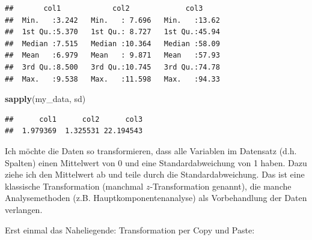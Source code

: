 \documentclass[]{book}
\newenvironment{Shaded}{\begin{snugshade}}{\end{snugshade}}
\newcommand{\DataTypeTok}[1]{\textcolor[rgb]{0.13,0.29,0.53}{#1}}
\newcommand{\KeywordTok}[1]{\textcolor[rgb]{0.13,0.29,0.53}{\textbf{#1}}}
\newcommand{\NormalTok}[1]{#1}
\newcommand{\OperatorTok}[1]{\textcolor[rgb]{0.81,0.36,0.00}{\textbf{#1}}}
\newcommand{\StringTok}[1]{\textcolor[rgb]{0.31,0.60,0.02}{#1}}
\begin{document}
\begin{verbatim}
##       col1            col2             col3      
##  Min.   :3.242   Min.   : 7.696   Min.   :13.62  
##  1st Qu.:5.370   1st Qu.: 8.727   1st Qu.:45.94  
##  Median :7.515   Median :10.364   Median :58.09  
##  Mean   :6.979   Mean   : 9.871   Mean   :57.93  
##  3rd Qu.:8.500   3rd Qu.:10.745   3rd Qu.:74.78  
##  Max.   :9.538   Max.   :11.598   Max.   :94.33
\end{verbatim}

\begin{Shaded}
\begin{Highlighting}[]
\KeywordTok{sapply}\NormalTok{(my_data, sd)}
\end{Highlighting}
\end{Shaded}

\begin{verbatim}
##      col1      col2      col3 
##  1.979369  1.325531 22.194543
\end{verbatim}

Ich möchte die Daten so transformieren, dass alle Variablen im Datensatz (d.h. Spalten) einen Mittelwert von 0 und eine Standardabweichung von 1 haben. Dazu ziehe ich den Mittelwert ab und teile durch die Standardabweichung. Das ist eine klassische Transformation (manchmal \(z\)-Transformation genannt), die manche Analysemethoden (z.B. Hauptkomponentenanalyse) als Vorbehandlung der Daten verlangen.

Erst einmal das Naheliegende: Transformation per Copy und Paste:

\begin{Shaded}
\end{Shaded}
\end{document}

